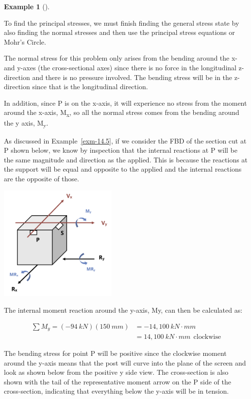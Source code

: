 \documentclass[
  letterpaper,
  DIV=11,
  numbers=noendperiod]{scrreprt}
\theoremstyle{definition}
\newtheorem{example}{Example}[chapter]
\theoremstyle{remark}
\begin{document}
\begin{tcolorbox}
\begin{example}[]
\begin{tcolorbox}
To find the principal stresses, we must finish finding the general
stress state by also finding the normal stresses and then use the
principal stress equations or Mohr's Circle.

The normal stress for this problem only arises from the bending around
the x- and y-axes (the cross-sectional axes) since there is no force in
the longitudinal z-direction and there is no pressure involved. The
bending stress will be in the z-direction since that is the longitudinal
direction.

In addition, since P is on the x-axis, it will experience no stress from
the moment around the x-axis, M\textsubscript{x}, so all the normal
stress comes from the bending around the y axis, M\textsubscript{y}.

As discussed in Example~\ref{exm-14.5}, if we consider the FBD of the
section cut at P shown below, we know by inspection that the internal
reactions at P will be the same magnitude and direction as the applied.
This is because the reactions at the support will be equal and opposite
to the applied and the internal reactions are the opposite of those.

\begin{center}
\includegraphics[width=2.3125in,height=\textheight]{images/CH14 PNGs/example 14.7 part 2.png}
\end{center}

The internal moment reaction around the y-axis, My, can then be
calculated as:

\[
\begin{aligned}
\sum M_y=(-94{~kN})(150{~mm})&=-14,100{~kN}\cdot{mm} \\
&=14,100{~kN}\cdot{mm}~~\text{clockwise}
\end{aligned}
\]

The bending stress for point P will be positive since the clockwise
moment around the y-axis means that the post will curve into the plane
of the screen and look as shown below from the positive y side view. The
cross-section is also shown with the tail of the representative moment
arrow on the P side of the cross-section, indicating that everything
below the y-axis will be in tension.


\end{tcolorbox}
\end{example}
\end{tcolorbox}
\end{document}
